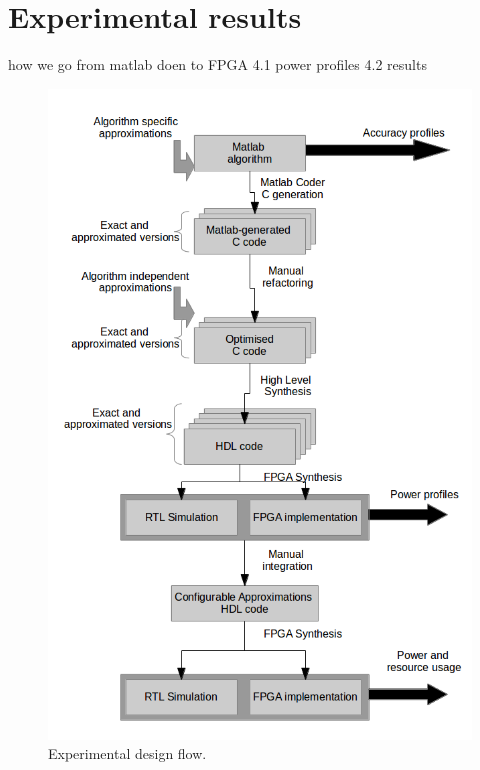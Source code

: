 \section{Experimental results}\label{experiments}

how we go from matlab doen to FPGA
4.1 power profiles
4.2 results

\begin{figure}[tb]
  \centering
  \includegraphics[width=0.9\columnwidth]{img/experimental_flow.png}
  \caption{Experimental design flow.}
  \label{fig:experimental_flow}
\end{figure}
